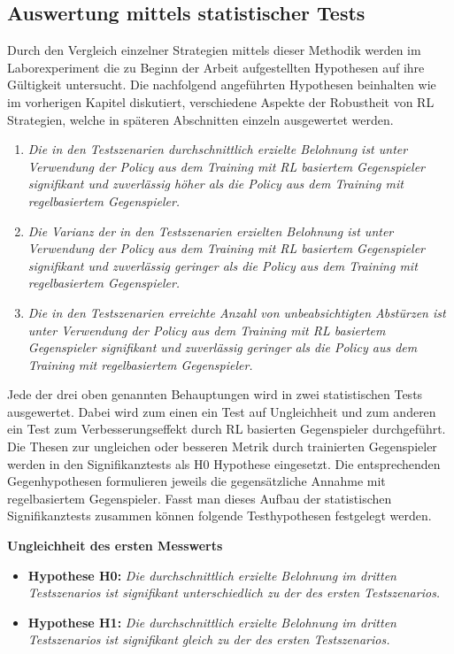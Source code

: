 \subsection{Auswertung mittels statistischer Tests}

Durch den Vergleich einzelner Strategien mittels dieser Methodik werden im Laborexperiment die zu Beginn der Arbeit aufgestellten Hypothesen auf ihre Gültigkeit untersucht.
Die nachfolgend angeführten Hypothesen beinhalten wie im vorherigen Kapitel diskutiert, verschiedene Aspekte der Robustheit von RL Strategien, welche in späteren Abschnitten einzeln ausgewertet werden.
\begin{enumerate}
    \item \textit{Die in den Testszenarien durchschnittlich erzielte Belohnung ist unter Verwendung der Policy aus dem Training mit RL basiertem Gegenspieler signifikant und zuverlässig höher als die Policy aus dem Training mit regelbasiertem Gegenspieler.}
    \item \textit{Die Varianz der in den Testszenarien erzielten Belohnung ist unter Verwendung der Policy aus dem Training mit RL basiertem Gegenspieler signifikant und zuverlässig geringer als die Policy aus dem Training mit regelbasiertem Gegenspieler.}
    \item \textit{Die in den Testszenarien erreichte Anzahl von unbeabsichtigten Abstürzen ist unter Verwendung der Policy aus dem Training mit RL basiertem Gegenspieler signifikant und zuverlässig geringer als die Policy aus dem Training mit regelbasiertem Gegenspieler.}
\end{enumerate}

Jede der drei oben genannten Behauptungen wird in zwei statistischen Tests ausgewertet.
Dabei wird zum einen ein Test auf Ungleichheit und zum anderen ein Test zum Verbesserungseffekt durch RL basierten Gegenspieler durchgeführt.
Die Thesen zur ungleichen oder besseren Metrik durch trainierten Gegenspieler werden in den Signifikanztests als H0 Hypothese eingesetzt.
Die entsprechenden Gegenhypothesen formulieren jeweils die gegensätzliche Annahme mit regelbasiertem Gegenspieler. 
Fasst man dieses Aufbau der statistischen Signifikanztests zusammen können folgende Testhypothesen festgelegt werden. 

\textbf{Ungleichheit des ersten Messwerts}
\begin{itemize}
    \item \textbf{Hypothese H0:} \textit{Die durchschnittlich erzielte Belohnung im dritten Testszenarios ist signifikant unterschiedlich zu der des ersten Testszenarios.}
    \item \textbf{Hypothese H1:} \textit{Die durchschnittlich erzielte Belohnung im dritten Testszenarios ist signifikant gleich zu der des ersten Testszenarios.}
\end{itemize}

